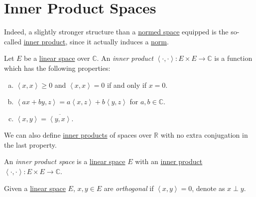 \section{Inner Product Spaces}
Indeed, a slightly stronger structure than a \hyperref[def:normed-vector-space]{normed space} equipped is the so-called \hyperref[def:inner-product]{inner product}, since it actually induces a \hyperref[def:norm]{norm}.
\begin{definition}\label{def:inner-product}
	Let \(E\) be a \hyperref[def:linear-vector-space]{linear space} over \(\mathbb{C} \). An \emph{inner product} \(\left\langle \cdot, \cdot \right\rangle \colon E \times E \to \mathbb{C} \) is a function which has the following properties:
	\begin{enumerate}[(a)]
		\item \(\left\langle x, x \right\rangle \geq 0\) and \(\left\langle x, x \right\rangle = 0\) if and only if \(x = 0\).
		\item \(\left\langle ax + by, z \right\rangle = a\left\langle x, z \right\rangle + b \left\langle y, z \right\rangle  \) for \(a, b\in \mathbb{C} \).
		\item \(\left\langle x, y \right\rangle = \overline{\left\langle y, x \right\rangle }\).
	\end{enumerate}
\end{definition}

\begin{notation}
	We can also define \hyperref[def:inner-product]{inner products} of spaces over \(\mathbb{R} \) with no extra conjugation in the last property.
\end{notation}

\begin{definition}\label{def:inner-product-space}
	An \emph{inner product space} is a \hyperref[def:linear-vector-space]{linear space} \(E\) with an \hyperref[def:inner-product]{inner product} \(\left\langle \cdot, \cdot \right\rangle \colon E\times E\to \mathbb{C} \).
\end{definition}
\begin{definition}[Orthogonal]\label{def:orthogonal}
	Given a \hyperref[def:linear-vector-space]{linear space} \(E\), \(x, y\in E\) are \emph{orthogonal} if \(\left\langle x, y \right\rangle = 0\), denote as \(x\perp y\).
\end{definition}

